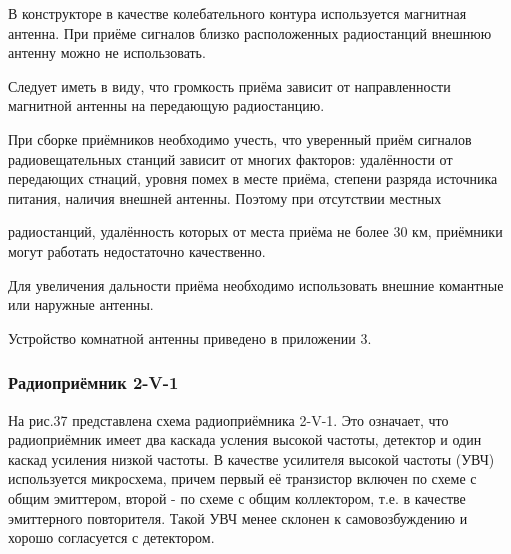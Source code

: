 \documentclass[12pt]{article}
\begin{document}
В конструкторе в качестве колебательного контура используется магнитная антенна. При приёме сигналов близко расположенных радиостанций внешнюю антенну можно не использовать.

Следует иметь в виду, что громкость приёма зависит от направленности магнитной антенны на передающую радиостанцию.

При сборке приёмников необходимо учесть, что уверенный приём сигналов радиовещательных станций зависит от многих факторов: удалённости от передающих стнаций, уровня помех в месте приёма, степени разряда источника питания, наличия внешней антенны. Поэтому при отсутствии местных 

\newpage

радиостанций, удалённость которых от места приёма не более 30 км, приёмники могут работать недостаточно качественно.

Для увеличения дальности приёма необходимо использовать внешние комантные или наружные антенны.

Устройство комнатной антенны приведено в приложении 3.
\vspace*{1cm}
\subsubsection{Радиоприёмник 2-V-1}

На рис.37 представлена схема радиоприёмника 2-V-1. Это означает, что радиоприёмник имеет два каскада усления высокой частоты, детектор и один каскад усиления низкой частоты. В качестве усилителя высокой частоты (УВЧ) используется микросхема, причем  первый её транзистор включен по схеме с общим эмиттером, второй - по схеме с общим коллектором, т.е. в качестве эмиттерного повторителя. Такой УВЧ менее склонен к самовозбуждению и хорошо согласуется с детектором.

\vspace*{0.5cm}
\hrulefill
\end{document}
